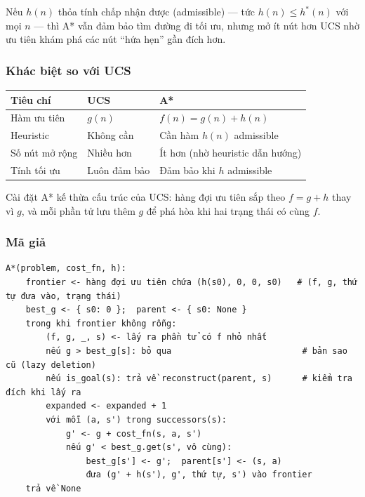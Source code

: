 Nếu $h(n)$ thỏa tính chấp nhận được (admissible) — tức $h(n) \le h^*(n)$ với mọi $n$ — thì A* vẫn đảm bảo tìm đường đi tối ưu, nhưng mở ít nút hơn UCS nhờ ưu tiên khám phá các nút ``hứa hẹn'' gần đích hơn.

\subsubsection{Khác biệt so với UCS}

{\renewcommand{\arraystretch}{1.25}
\begin{longtable}{|l|l|l|}
\hline
\textbf{Tiêu chí} & \textbf{UCS} & \textbf{A*} \\ \hline
\endhead
\hline
\endlastfoot
Hàm ưu tiên & $g(n)$ & $f(n) = g(n) + h(n)$ \\ \hline
Heuristic & Không cần & Cần hàm $h(n)$ admissible \\ \hline
Số nút mở rộng & Nhiều hơn & Ít hơn (nhờ heuristic dẫn hướng) \\ \hline
Tính tối ưu & Luôn đảm bảo & Đảm bảo khi $h$ admissible \\
\end{longtable}
}

Cài đặt A* kế thừa cấu trúc của UCS: hàng đợi ưu tiên sắp theo $f = g + h$ thay vì $g$, và mỗi phần tử lưu thêm $g$ để phá hòa khi hai trạng thái có cùng $f$.

\subsubsection{Mã giả}

\begin{Verbatim}[breaklines=true, fontsize=\footnotesize, frame=single]
A*(problem, cost_fn, h):
    frontier <- hàng đợi ưu tiên chứa (h(s0), 0, 0, s0)   # (f, g, thứ tự đưa vào, trạng thái)
    best_g <- { s0: 0 };  parent <- { s0: None }
    trong khi frontier không rỗng:
        (f, g, _, s) <- lấy ra phần tử có f nhỏ nhất
        nếu g > best_g[s]: bỏ qua                          # bản sao cũ (lazy deletion)
        nếu is_goal(s): trả về reconstruct(parent, s)      # kiểm tra đích khi lấy ra
        expanded <- expanded + 1
        với mỗi (a, s') trong successors(s):
            g' <- g + cost_fn(s, a, s')
            nếu g' < best_g.get(s', vô cùng):
                best_g[s'] <- g';  parent[s'] <- (s, a)
                đưa (g' + h(s'), g', thứ tự, s') vào frontier
    trả về None
\end{Verbatim}

